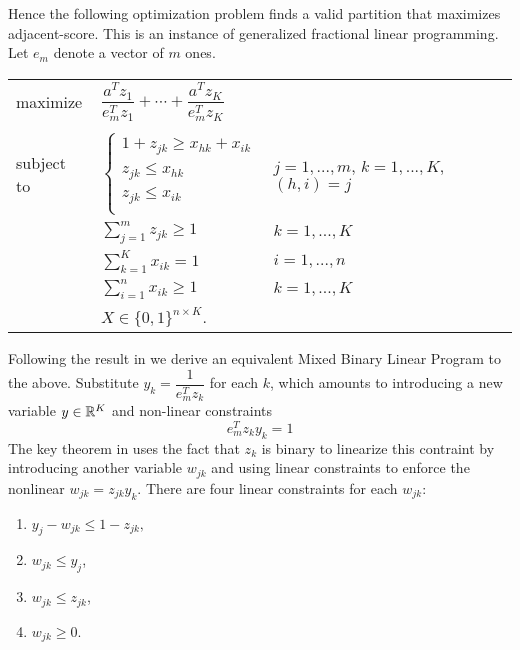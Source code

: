 Hence the following optimization problem finds a valid partition that
maximizes adjacent-score. This is an instance of generalized fractional
linear programming. Let $e_m$ denote a vector of $m$ ones.

\begin{center}
\bgroup
\def\arraystretch{1.5}
\begin{tabular}{l l l}
maximize   & $\dfrac{a^T z_1}{e_m^T z_1} + \cdots +
              \dfrac{a^T z_K}{e_m^T z_K}$ \\ \\
subject to 
           & $\begin{cases}
                 1 + z_{jk} \geq x_{hk} + x_{ik} \\
                 z_{jk} \leq x_{hk}             \\
                 z_{jk} \leq x_{ik}             \\
             \end{cases}$
           & $j = 1, ..., m$, $k = 1, ..., K$, $(h,i) = j$ \\
           & $\sum_{j=1}^m z_{jk} \geq 1$ & $k = 1, ..., K$ \\
           & $\sum_{k=1}^K x_{ik} = 1$ & $i = 1, ..., n$ \\
           & $\sum_{i=1}^n x_{ik} \geq 1$ & $k = 1, ..., K$ \\
           & $X \in \{0, 1\}^{n \times K}$.
\end{tabular}
\egroup
\end{center}

Following the result in \cite{Li:94} we derive an equivalent Mixed
Binary Linear Program to the above.
Substitute $y_k = \dfrac{1}{e_m^T z_k}$ for each $k$, which amounts to
introducing a new variable $y \in \mathbb{R}^K$ and non-linear constraints
\[ e_m^T z_k y_k = 1 \]
The key theorem in \cite{Li:94} uses the fact that $z_k$ is binary to
linearize this contraint by introducing another variable $w_{jk}$ and
using linear constraints to enforce the nonlinear $w_{jk} = z_{jk} y_k$.
There are four linear constraints for each $w_{jk}$:

\begin{enumerate}
\item
$y_j - w_{jk} \leq 1 - z_{jk}, $
\item
$w_{jk} \leq y_j$,
\item
$w_{jk} \leq z_{jk}$,
\item
$w_{jk} \geq 0$.
\end{enumerate}

